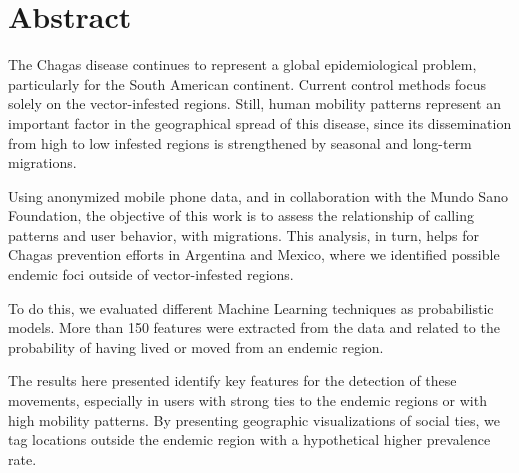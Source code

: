 
\chapter{Abstract}
\label{cha:abstract}

The Chagas disease continues to represent a global epidemiological problem, particularly for the South American continent.
Current control methods focus solely on the vector-infested regions. 
Still, human mobility patterns represent an important factor in the geographical spread of this disease, since its dissemination from high to low infested regions is strengthened by seasonal and long-term migrations. 

Using anonymized mobile phone data, and in collaboration with the Mundo Sano Foundation, the objective of this work is to assess the relationship of calling patterns and user behavior, with migrations. 
This analysis, in turn, helps for Chagas prevention efforts in Argentina and Mexico, where we identified possible endemic foci outside of vector-infested regions. 

To do this, we evaluated different Machine Learning techniques as probabilistic models. 
More than 150 features were extracted from the data and related to the probability of having lived or moved from an endemic region. 

The results here presented identify key features for the detection of these movements, especially in users with strong ties to the endemic regions or with high mobility patterns. 
By presenting geographic visualizations of social ties, we tag locations outside the endemic region with a hypothetical higher prevalence rate.
